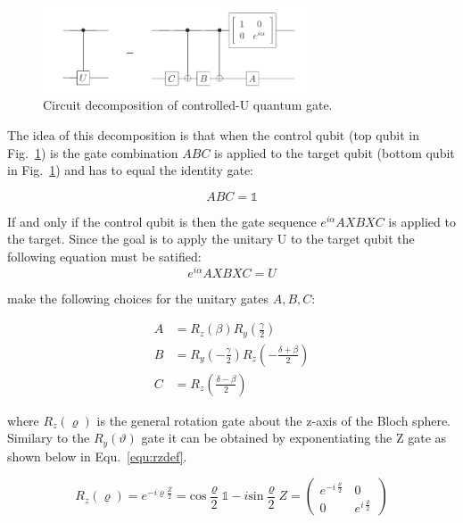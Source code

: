 \begin{figure}[ht]
   \centering
   \includegraphics[width=0.7\textwidth]{img/controlledudecomp.png}
   \caption[]{Circuit decomposition of controlled-U quantum gate.\footnotemark[14]}
   \label{img:cudecomposition}
\end{figure}


The idea of this decomposition is that when the control qubit (top qubit in Fig.~\ref{img:cudecomposition}) is \0 the gate combination $ABC$ is applied to the target qubit (bottom qubit in Fig.~\ref{img:cudecomposition}) and has to equal the identity gate:

\begin{equation}
\label{equ:abcidentity}
ABC = \mathbb{1}
\end{equation}

If and only if the control qubit is \1 then the gate sequence $e^{i\alpha}AXBXC$ is applied to the target. Since the goal is to apply the unitary U to the target qubit the following equation must be satified:
\begin{equation}
\label{equ:UAXBXC}
e^{i\alpha}AXBXC = U
\end{equation}

 make the following choices for the unitary gates $A,B,C$:

\begin{align}\label{equ:abc}
A &=  R_z(\beta)R_y(\frac{\gamma}{2})\\
B &= R_y(-\frac{\gamma}{2})R_z(-\frac{\delta+\beta}{2})\\
C &= R_z(\frac{\delta-\beta}{2})
\end{align}

where $R_z(\varrho)$ is the general rotation gate about the z-axis of the Bloch sphere. Similary to the $R_y(\vartheta)$ gate it can be obtained by exponentiating the Z gate as shown below in Equ.~\ref{equ:rzdef}.

\begin{equation}
\label{equ:rzdef}
R_z(\varrho) = e^{-i\varrho\frac{Z}{2}} = \text{cos}\frac{\varrho}{2} \mathbb{1}- i\text{sin}\frac{\varrho}{2}Z = \begin{pmatrix}
e^{-i\frac{\varrho}{2}} & 0 \\
0 & e^{i\frac{\varrho}{2}}
\end{pmatrix}
\end{equation}

